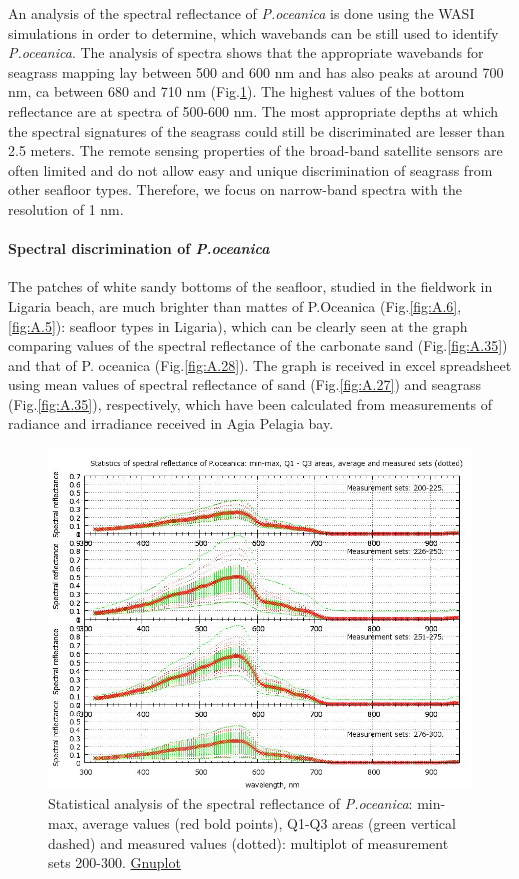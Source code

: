 \documentclass[10pt, a4paper]{article}
\begin{document}
An analysis of the spectral reflectance of \textit{P.oceanica} is done using the WASI simulations in order to
determine, which wavebands can be still used to identify \textit{P.oceanica}. The analysis of spectra shows
that the appropriate wavebands for seagrass mapping lay between 500 and 600 nm and has
also peaks at around 700 nm, ca between 680 and 710 nm (Fig.\ref{fig:4.10}). The highest values of the bottom
reflectance are at spectra of 500-600 nm. The most appropriate depths at which the spectral signatures of the seagrass
could still be discriminated are lesser than 2.5 meters.
The remote sensing properties of the broad-band satellite sensors are often limited and do not allow
easy and unique discrimination of seagrass from other seafloor types. Therefore, we focus on narrow-band
spectra with the resolution of 1 nm.

\paragraph{Spectral discrimination of \textit{P.oceanica}}
The patches of white sandy bottoms of the seafloor, studied in the fieldwork in Ligaria beach, are
much brighter than mattes of P.Oceanica (Fig.\ref{fig:A.6}, \ref{fig:A.5}): seafloor types in Ligaria), which can be clearly seen
at the graph comparing values of the spectral reflectance of the carbonate sand (Fig.\ref{fig:A.35}) and that of P.
oceanica (Fig.\ref{fig:A.28}).
The graph is received in excel spreadsheet using mean values of spectral reflectance of
sand (Fig.\ref{fig:A.27}) and seagrass (Fig.\ref{fig:A.35}), respectively, which have been calculated from measurements of radiance and
irradiance received in Agia Pelagia bay.

\begin{figure}[h]
	\centering
	\includegraphics[scale=0.40]{GNU-19.jpg}
	\caption{Statistical analysis of the spectral reflectance of \textit{P.oceanica}: min-max, average values (red bold points), Q1-Q3 areas (green vertical dashed) and 			measured values (dotted): multiplot of measurement sets 200-300. \href{http://www.gnuplot.info/}{Gnuplot}}
	\label{fig:4.10}
\end{figure}
\end{document}

